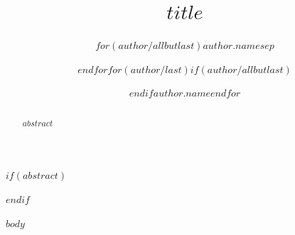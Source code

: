 \documentclass[11pt]{article}
\title{$title$}
\author{}
\author{$for(author/allbutlast)$$author.name$$sep$ \and $endfor$$for(author/last)$$if(author/allbutlast)$ \and $endif$$author.name$$endfor$}
\begin{document}
\maketitle

$if(abstract)$
\begin{abstract}
$abstract$
\end{abstract}
$endif$

$body$

\end{document}
